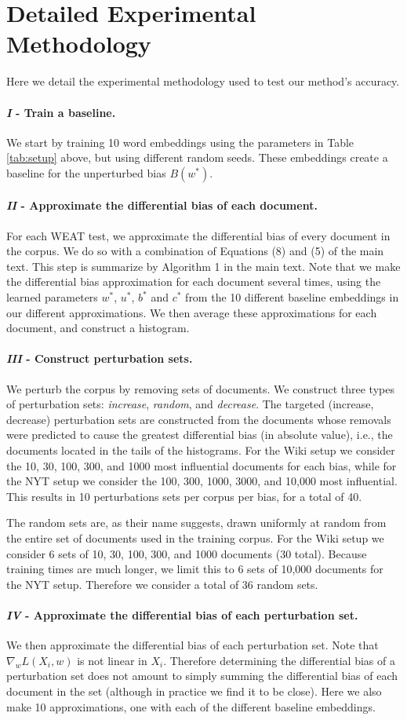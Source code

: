 \documentclass{article}
\newcommand{\xhdr}[1]{\paragraph*{\bf {#1.}}}
\begin{document}
\section{Detailed Experimental Methodology}
Here we detail the experimental methodology used to test our method's accuracy.

\xhdr{\emph{I} - Train a baseline}
We start by training 10 word embeddings using the parameters in Table \ref{tab:setup} above, but using different random seeds.
These embeddings create a baseline for the unperturbed bias $B(w^*)$.

\xhdr{\emph{II} - Approximate the differential bias of each document}
For each WEAT test, we approximate the differential bias of every document in the corpus.
We do so with a combination of Equations (8) and (5) of the main text. 
This step is summarize by Algorithm 1 in the main text.
Note that we make the differential bias approximation for each document several times, using the learned parameters $w^*$, $u^*$, $b^*$ and $c^*$ from the 10 different baseline embeddings in our different approximations.
We then average these approximations for each document, and construct a histogram.

\xhdr{\emph{III} - Construct perturbation sets}
We perturb the corpus by removing sets of documents. We construct three types of perturbation sets: \emph{increase}, \emph{random}, and \emph{decrease}.
The targeted (increase, decrease) perturbation sets are constructed from the documents whose removals were predicted to cause the greatest differential bias (in absolute value), i.e., the documents located in the tails of the histograms. For the Wiki setup we consider the 10, 30, 100, 300, and 1000 most influential documents for each bias, while for the NYT setup we consider the 100, 300, 1000, 3000, and 10,000 most influential. This results in 10 perturbations sets per corpus per bias, for a total of 40.

The random sets are, as their name suggests, drawn uniformly at random from the entire set of documents used in the training corpus.
For the Wiki setup we consider 6 sets of 10, 30, 100, 300, and 1000 documents (30 total). Because training times are much longer, we limit this to 6 sets of 10,000 documents for the NYT setup. Therefore we consider a total of 36 random sets.

\xhdr{\emph{IV} - Approximate the differential bias of each perturbation set}
We then approximate the differential bias of each perturbation set. Note that $\nabla_w L(X_i, w)$ is not linear in $X_i$. Therefore determining the differential bias of a perturbation set does not amount to simply summing the differential bias of each document in the set (although in practice we find it to be close). Here we also make 10 approximations, one with each of the different baseline embeddings.
\end{document}
